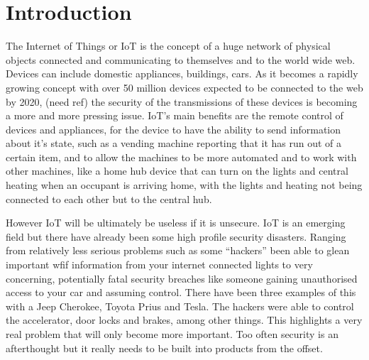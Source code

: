 
\chapter{Introduction}
\label{intro}


\newcommand{\keyword}[1]{\textbf{#1}}
\newcommand{\tabhead}[1]{\textbf{#1}}
\newcommand{\code}[1]{\texttt{#1}}
\newcommand{\file}[1]{\texttt{\bfseries#1}}
\newcommand{\option}[1]{\texttt{\itshape#1}}


The Internet of Things or IoT is the concept of a huge network of physical objects connected and communicating to themselves and to the world wide web.
Devices can include domestic appliances, buildings, cars. As it becomes a rapidly growing concept with over 50 million devices expected to be connected to the web by 2020, (need ref)
the security of the transmissions of these devices is becoming a more and more pressing issue. IoT's main benefits are the remote control of devices and appliances, 
for the device to have the ability to send information about it's state, such as a vending machine reporting that it has run out of a certain item, and to allow the machines to be 
more automated and to work with other machines, like a home hub device that can turn on the lights and central heating when an occupant is arriving home, with the lights and heating not being connected to each other but to the 
central hub.
	
	However IoT will be ultimately be useless if it is unsecure. IoT is an emerging field but there have already been some high profile security disasters. Ranging from relatively less serious problems such as
some ``hackers''  been able to glean important wfif information from your internet connected lights\cite{[1]} to very concerning, potentially fatal security breaches like someone gaining unauthorised access to your car
and assuming control. There have been three examples of this with a Jeep Cherokee, Toyota Prius and Tesla. The hackers were able to control the accelerator, door locks and brakes, among other things. This highlights
a very real problem that will only become more important. Too often security is an afterthought but it really needs to be built into products from the offset.
	
